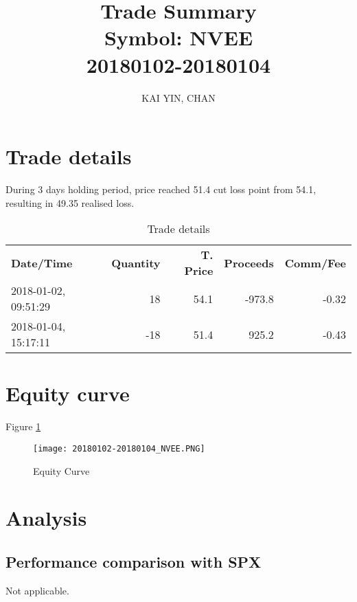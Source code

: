 \documentclass{article}
\begin{document}
\title{Trade Summary  \\ Symbol: NVEE \\ 20180102-20180104}
\author{KAI YIN, CHAN}
\maketitle
\section{Trade details}
During 3 days holding period, price reached 51.4 cut loss point from 54.1, resulting in 49.35 realised loss.

\begin{table}[htbp]
  \centering
  \caption{Trade details}
    \begin{tabular}{p{5.145em}rrrr}
    \textbf{Date/Time} & \multicolumn{1}{p{4.215em}}{\textbf{Quantity}} & \multicolumn{1}{p{4.215em}}{\textbf{T. Price}} & \multicolumn{1}{p{4.215em}}{\textbf{Proceeds}} & \multicolumn{1}{p{4.215em}}{\textbf{Comm/Fee}} \\
    2018-01-02, 09:51:29 & 18     & 54.1 & -973.8 & -0.32 \\
    2018-01-04, 15:17:11 & -18    & 51.4   & 925.2 & -0.43 \\
    \end{tabular}%
  \label{tab:addlabel}%
\end{table}%
\section{Equity curve}
Figure \ref{Equity Curve}
\begin{figure}[h]
\caption{Equity Curve}
\label{Equity Curve}
\texttt{[image: 20180102-20180104\_NVEE.PNG]}
\end{figure}

\section{Analysis}
\subsection{Performance comparison with SPX}
Not applicable.

\iffalse
\begin{figure}
\includegraphics[width=\paperwidth,keepaspectratio] {20170906-20171003_THOSPX.PNG}
\end{figure}
\fi
\end{document}
